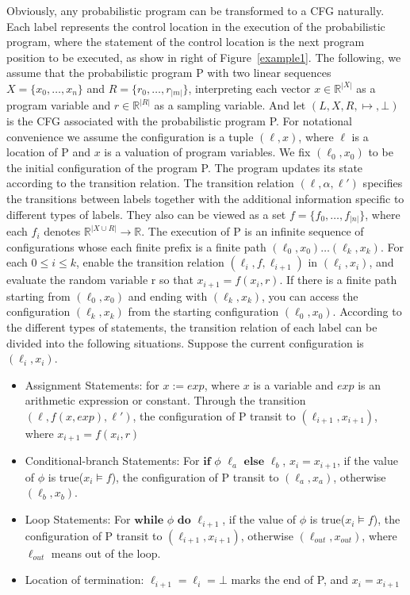 \documentclass[runningheads]{llncs}
\begin{document}
Obviously, any probabilistic program can be transformed to a CFG naturally. Each label represents the control location in the execution of the probabilistic program, where the statement of the control location is the next program position to be executed, as show in right of Figure~\ref{example1}. 
The following, we assume that the probabilistic program P with two linear sequences $X=\{x_0,\dots,x_{n}\}$ and $R=\{r_0,\dots,r_{|m|}\}$, interpreting each vector $x \in \mathbb{R}^{|X|}$ as a program variable and $r \in \mathbb{R}^{|R|}$ as a sampling variable. And let $(L,X,R,\mapsto,\bot)$ is the CFG associated with the probabilistic program P. For notational convenience we assume the configuration is a tuple $(\ell, x)$, where $\ell$ is a location of P and $x$ is a valuation of program variables. We fix $(\ell_0, x_0)$ to be the initial configuration of the program P. The program updates its state according to the transition relation. The transition relation $(\ell,\alpha,\ell')$ specifies the transitions between labels together with the additional information specific to different types of labels. They also can be viewed as a set $f=\{f_0,\dots,f_{|n|}\}$, where each $f_i$ denotes $\mathbb{R}^{|X \cup R|} \to \mathbb{R}$. The execution of P is an infinite sequence of configurations whose each finite prefix is a finite path $(\ell_0, x_0) \dots (\ell_k, x_k)$. For each $0\leq i\leq k$, enable the transition relation $(\ell_i, f, \ell_{i+1})$ in $(\ell_i, x_i)$, and evaluate the random variable r so that $x_{i+1}=f(x_i,r)$. If there is a finite path starting from $(\ell_0, x_0)$ and ending with $(\ell_k, x_k)$, you can access the configuration $(\ell_k, x_k)$ from the starting configuration $(\ell_0, x_0)$. According to the different types of statements, the transition relation of each label can be divided into the following situations. Suppose the current configuration is $(\ell_i, x_i)$.
\renewcommand{\labelitemi}{$\vcenter{\hbox{\tiny$\bullet$}}$}
\begin{itemize}
	\item  Assignment Statements: for $x:=exp$, where $x$ is a variable and $exp$ is an arithmetic expression or constant. Through the transition $(\ell, f(x,exp), \ell')$, the configuration of P transit to $(\ell_{i+1}, x_{i+1})$, where $x_{i+1} = f(x_i,r)$
	\item  Conditional-branch Statements: For $\textbf{if}$ $\phi$ $\ell_a$ $\textbf{else}$ $\ell_b$, $x_{i} = x_{i+1}$, if the value of $\phi$ is true($x_i \models f$), the configuration of P transit to $(\ell_a, x_a)$, otherwise $(\ell_b, x_b)$.
	\item  Loop Statements: For $\textbf{while}$ $\phi$ $\textbf{do}$ $\ell_{i+1}$, if the value of $\phi$ is true($x_i \models f$), the configuration of P transit to $(\ell_{i+1}, x_{i+1})$, otherwise $(\ell_{out}, x_{out})$, where $\ell_{out}$ means out of the loop.
	\item  Location of termination: $\ell_{i+1} =\ell_{i}=\bot$ marks the end of P, and $x_{i} = x_{i+1}$
\end{itemize}
\end{document}

